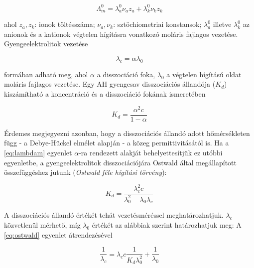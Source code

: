 \begin{equation}
\label{eq:kohlrausch2}
	\Lambda _m^0
	=
	\lambda _a^0 \nu _a z_a + \lambda _k^0 \nu _k z_k
\end{equation}

ahol $z_a, z_k$: ionok töltésszáma; $\nu _a, \nu _k$: sztöchiometriai konstansok; $\lambda _a^0$ illetve $\lambda _k^0$ az anionok és a kationok végtelen hígításra vonatkozó moláris fajlagos vezetése.
Gyengeelektrolitok vezetése

\begin{equation}
\label{eq:lambdam}
        \lambda_c
        =
        \alpha
	\lambda_0
\end{equation}

formában adható meg, ahol $\alpha$ a disszociáció foka, $\lambda _0$ a végtelen hígítású oldat moláris fajlagos vezetése.
Egy AH gyengesav disszociációs állandója ($K_d$) kiszámítható a koncentráció és a disszociáció fokának ismeretében

\begin{equation}
\label{eq:kd}
        K_d
        =
        \frac{\alpha^2 c}{1-\alpha}
\end{equation}

Érdemes megjegyezni azonban, hogy a disszociációs állandó adott hőmérsékleten függ - a Debye-Hückel elmélet alapján - a közeg permittivitásától is.
Ha a \ref{eq:lambdam} egyenlet $\alpha$-ra rendezett alakját behelyettesítjük ez utóbbi egyenletbe, a gyengeelektrolitok disszociációjára Ostwald által megállapított összefüggéshez jutunk (\emph{Ostwald féle hígítási törvény}):

\begin{equation}
\label{eq:ostwald}
        K_d
        =
        \frac{\lambda_c^2 c}{\lambda_0^2 - \lambda_0\lambda_c}
\end{equation}

A disszociációs állandó értékét tehát vezetésméréssel meghatározhatjuk. 
$\lambda_c$ közvetlenül mérhető, míg $\lambda_0$ értékét az alábbiak szerint határozhatjuk meg:
A \ref{eq:ostwald} egyenlet átrendezésével

\begin{equation}
\label{eq:ostwald2}
        \frac{1}{\lambda_c}
        =
	\lambda_c
	c
	\frac{1}{K_d \lambda_0^2}
	+\frac{1}{\lambda_0}
\end{equation}

